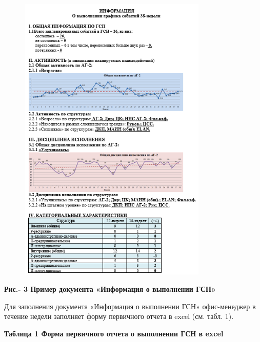 \begin{figure}[H]
	\centering
	\includegraphics[width=0.8\textwidth]{media/ekon/image3}
	\caption*{}
\end{figure}


{\bfseries Рис.- 3 Пример документа «Информация о выполнении ГСН»}

Для заполнения документа «Информация о выполнении ГСН» офис-менеджер в
течение недели заполняет форму первичного отчета в excel (см. табл. 1).

{\bfseries Таблица 1 Форма первичного отчета о выполнении ГСН в excel}

